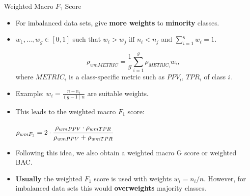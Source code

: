 \documentclass[11pt,compress,t,notes=noshow, xcolor=table]{beamer}
\begin{document}
\begin{vbframe}{Weighted Macro $F_1$ Score}

	\footnotesize{

	\begin{itemize}

		\item For imbalanced data sets, give \textbf{more weights} to \textbf{minority} classes.
        \vspace{10pt}
  
        \item $w_1,\ldots,w_g \in[0,1]$  such that $w_i > w_j$ iff $n_i < n_j$ and $\sum_{i=1}^g w_i = 1.$

        $$\rho_{wmMETRIC} = \frac{1}{g}\sum_{i=1}^g \rho_{METRIC_i} w_i,$$
        where $METRIC_i$ is a class-specific metric such as $PPV_i$, $TPR_i$ of class $i$.
        \vspace{10pt}

	 
		\item Example: $w_i = \frac{n - n_i}{(g-1)n}$ are suitable weights.
        \vspace{10pt}

		\item This leads to the weighted macro $F_1$ score:
			
		$\rho_{wmF_1} = 2 \cdot \cfrac{\rho_{wmPPV} \cdot \rho_{wmTPR}}{\rho_{wmPPV} + 
			\rho_{wmTPR}}$
		\vspace{10pt}
  
		\item Following this idea, we also obtain a weighted macro G score or weighted BAC.
        \vspace{10pt}
	
		\item \textbf{Usually} the weighted $F_1$ score is used with weights $w_i = n_i/n$. However, for imbalanced data sets this would \textbf{overweights} majority classes.

	\end{itemize}
	}
\end{vbframe}
\end{document}
